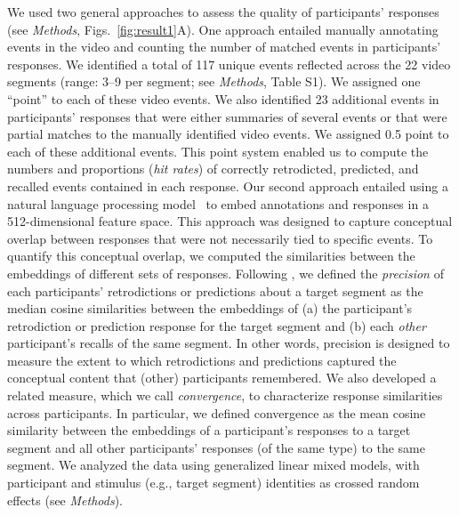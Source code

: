 \documentclass[10pt]{article}
\newcommand{\stimDescription}{S1} %
\begin{document}
We used two general approaches to assess the quality of participants' responses (see \textit{Methods}, Figs.~\ref{fig:result1}A).  One approach entailed manually annotating events in the video and counting the number of matched events in participants' responses.  We identified a total of 117 unique events reflected across the 22 video segments (range: 3--9 per segment; see \textit{Methods}, Table \stimDescription).  We assigned one ``point'' to each of these video events.  We also identified 23 additional events in participants' responses that were either summaries of several events or that were partial matches to the manually identified video events.  We assigned 0.5 point to each of these additional events.  This point system enabled us to compute the numbers and proportions (\textit{hit rates}) of correctly retrodicted, predicted, and recalled events contained in each response.  Our second approach entailed using a natural language processing model~\citep{CerEtal18} to embed annotations and responses in a 512-dimensional feature space.  This approach was designed to capture conceptual overlap between responses that were not necessarily tied to specific events.  To quantify this conceptual overlap, we computed the similarities between the embeddings of different sets of responses.  Following \cite{HeusEtal21}, we defined the \textit{precision} of each participants' retrodictions or predictions about a target segment as the median cosine similarities between the embeddings of (a) the participant's retrodiction or prediction response for the target segment and (b) each \textit{other} participant's recalls of the same segment.  In other words, precision is designed to measure the extent to which retrodictions and predictions captured the conceptual content that (other) participants remembered.  We also developed a related measure, which we call \textit{convergence}, to characterize response similarities across participants.  In particular, we defined convergence as the mean cosine similarity between the embeddings of a participant's responses to a target segment and all other participants' responses (of the same type) to the same segment.  We analyzed the data using generalized linear mixed models, with participant and stimulus (e.g., target segment) identities as crossed random effects (see \textit{Methods}).
\end{document}
